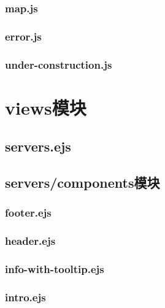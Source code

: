 \subsubsection{map.js}

\subsubsection{error.js}

\subsubsection{under-construction.js}


\section{views模块}
\subsection{servers.ejs}

\subsection{servers/components模块}
\subsubsection{footer.ejs}

\subsubsection{header.ejs}

\subsubsection{info-with-tooltip.ejs}

\subsubsection{intro.ejs}

